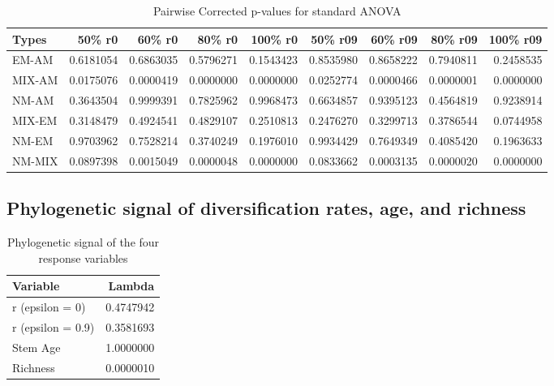\documentclass[]{article}
\begin{document}
\begin{table}[H]

\caption{\label{tab:unnamed-chunk-10}Pairwise Corrected p-values for standard ANOVA}
\centering
\begin{tabular}{l|r|r|r|r|r|r|r|r}
\hline
Types & 50\% r0 & 60\% r0 & 80\% r0 & 100\% r0 & 50\% r09 & 60\% r09 & 80\% r09 & 100\% r09\\
\hline
EM-AM & 0.6181054 & 0.6863035 & 0.5796271 & 0.1543423 & 0.8535980 & 0.8658222 & 0.7940811 & 0.2458535\\
\hline
MIX-AM & 0.0175076 & 0.0000419 & 0.0000000 & 0.0000000 & 0.0252774 & 0.0000466 & 0.0000001 & 0.0000000\\
\hline
NM-AM & 0.3643504 & 0.9999391 & 0.7825962 & 0.9968473 & 0.6634857 & 0.9395123 & 0.4564819 & 0.9238914\\
\hline
MIX-EM & 0.3148479 & 0.4924541 & 0.4829107 & 0.2510813 & 0.2476270 & 0.3299713 & 0.3786544 & 0.0744958\\
\hline
NM-EM & 0.9703962 & 0.7528214 & 0.3740249 & 0.1976010 & 0.9934429 & 0.7649349 & 0.4085420 & 0.1963633\\
\hline
NM-MIX & 0.0897398 & 0.0015049 & 0.0000048 & 0.0000000 & 0.0833662 & 0.0003135 & 0.0000020 & 0.0000000\\
\hline
\end{tabular}
\end{table}

\hypertarget{phylogenetic-signal-of-diversification-rates-age-and-richness}{%
\subsection{Phylogenetic signal of diversification rates, age, and
richness}\label{phylogenetic-signal-of-diversification-rates-age-and-richness}}

\begin{table}[H]

\caption{\label{tab:unnamed-chunk-11}Phylogenetic signal of the four response variables}
\centering
\begin{tabular}{l|r}
\hline
Variable & Lambda\\
\hline
r (epsilon = 0) & 0.4747942\\
\hline
r (epsilon = 0.9) & 0.3581693\\
\hline
Stem Age & 1.0000000\\
\hline
Richness & 0.0000010\\
\hline
\end{tabular}
\end{table}
\end{document}
